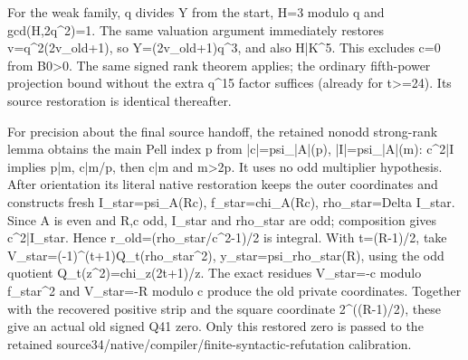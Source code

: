 For the weak family, q divides Y from the start, H=\allowbreak{}3 modulo q and gcd(H,2q\textasciicircum{}\allowbreak{}2)=\allowbreak{}1. The same valuation argument immediately restores v=\allowbreak{}q\textasciicircum{}\allowbreak{}2(2v\_\allowbreak{}old+\allowbreak{}1), so Y=\allowbreak{}(2v\_\allowbreak{}old+\allowbreak{}1)q\textasciicircum{}\allowbreak{}3, and also H|K\textasciicircum{}\allowbreak{}5. This excludes c=\allowbreak{}0 from B0\textgreater{}\allowbreak{}0. The same signed rank theorem applies; the ordinary fifth-power projection bound without the extra q\textasciicircum{}\allowbreak{}15 factor suffices (already for t\textgreater{}\allowbreak{}=\allowbreak{}24). Its source restoration is identical thereafter.



For precision about the final source handoff, the retained nonodd strong-rank lemma obtains the main Pell index p from |c|=\allowbreak{}psi\_\allowbreak{}|A|(p), |I|=\allowbreak{}psi\_\allowbreak{}|A|(m): c\textasciicircum{}\allowbreak{}2|I implies p|m, c|m/\allowbreak{}p, then c|m and m\textgreater{}\allowbreak{}2p. It uses no odd multiplier hypothesis. After orientation its literal native restoration keeps the outer coordinates and constructs fresh I\_\allowbreak{}star=\allowbreak{}psi\_\allowbreak{}A(Rc), f\_\allowbreak{}star=\allowbreak{}chi\_\allowbreak{}A(Rc), rho\_\allowbreak{}star=\allowbreak{}Delta I\_\allowbreak{}star. Since A is even and R,c odd, I\_\allowbreak{}star and rho\_\allowbreak{}star are odd; composition gives c\textasciicircum{}\allowbreak{}2|I\_\allowbreak{}star. Hence r\_\allowbreak{}old=\allowbreak{}(rho\_\allowbreak{}star/\allowbreak{}c\textasciicircum{}\allowbreak{}2-1)/\allowbreak{}2 is integral. With t=\allowbreak{}(R-1)/\allowbreak{}2, take V\_\allowbreak{}star=\allowbreak{}(-1)\textasciicircum{}\allowbreak{}(t+\allowbreak{}1)Q\_\allowbreak{}t(rho\_\allowbreak{}star\textasciicircum{}\allowbreak{}2), y\_\allowbreak{}star=\allowbreak{}psi\_\allowbreak{}rho\_\allowbreak{}star(R), using the odd quotient Q\_\allowbreak{}t(z\textasciicircum{}\allowbreak{}2)=\allowbreak{}chi\_\allowbreak{}z(2t+\allowbreak{}1)/\allowbreak{}z. The exact residues V\_\allowbreak{}star=\allowbreak{}-c modulo f\_\allowbreak{}star\textasciicircum{}\allowbreak{}2 and V\_\allowbreak{}star=\allowbreak{}-R modulo c produce the old private coordinates. Together with the recovered positive strip and the square coordinate 2\textasciicircum{}\allowbreak{}((R-1)/\allowbreak{}2), these give an actual old signed Q41 zero. Only this restored zero is passed to the retained source34/\allowbreak{}native/\allowbreak{}compiler/\allowbreak{}finite-syntactic-refutation calibration.



